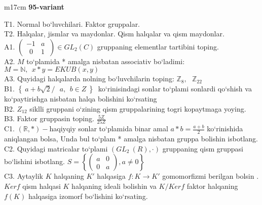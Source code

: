 \documentclass{article}
\begin{document}
\begin{tabular}{m{17cm}}
\textbf{95-variant}
\newline

T1. Normal bo`luvchilari. Faktor gruppalar. \\
T2. Halqalar, jismlar va maydonlar. Qism halqalar va qism maydonlar. \\
A1. \(\left( \begin{matrix}
 - 1 & a \\
\ \ 0 & 1
\end{matrix}\  \right) \in GL_{2}(C)\) gruppaning elementlar tartibini toping. \\
A2. \(M\) to`plamida * amalga nisbatan associativ bo`ladimi: \(M\mathbb{= N},\ \ x*y = EKUB(x,y)\) \\
A3. Quyidagi halqalarda nolning bo`luvchilarin toping: \(\mathbb{Z}_{8},\ \ \ \mathbb{Z}_{22}\) \\
B1. \(\left\{ \left. \ a + b\sqrt{2}/\ \ \ a,\ \ b \in Z\  \right\} \right.\ \) ko`rinisindagi sonlar to`plami sonlardi qo`shish va ko`paytirishga nisbatan halqa bolishini ko`rsating \\
B2. \(Z_{12}\) siklli gruppani o`zining qism gruppalarining tog\textquotesingle ri kopaytmaga yoying. \\
B3. Faktor gruppasin toping. \(\frac{5Z}{25Z}\) \\
C1. \((\mathbb{R},*) -\)haqiyqiy sonlar to`plamida binar amal \(a*b = \frac{a + b}{2}\) ko`rinishida aniqlangan bolsa, Unda bul to`plam * amalga nisbatan gruppa bolishin isbotlang. \\
C2. Quyidagi matricalar to`plami \((GL_{2}^{\ }\ (R), \cdot )\) gruppaning qism gruppasi bo`lishini isbotlang. \(S = \left\{ \begin{pmatrix}
a & 0 \\
0 & a
\end{pmatrix},a \neq 0 \right\}\) \\
C3. Aytaylik \(K\) halqaning \(K'\) halqasiga \(f:K \rightarrow K'\) gomomorfizmi berilgan bo\textquotesingle lsin . \(Kerf\) qism halqasi \(K\) halqaning ideali bo\textquotesingle lishin va \(K/Kerf\) faktor halqaning \(f(K)\) halqasiga izomorf bo`lishini ko`rsating. \\

\end{tabular}
\vspace{1cm}
\end{document}
